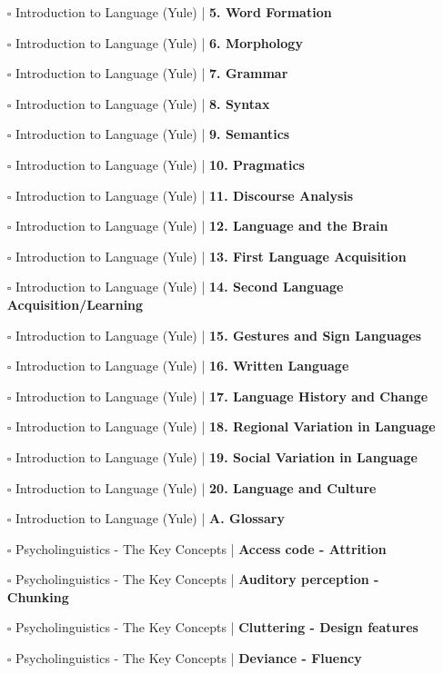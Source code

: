 \documentclass[a4, landscape, 12pt]{article}
\newcommand{\checkbox}{$\square$}%
\begin{document}
\begin{itemize}
{}
\item [\checkbox]  Introduction to Language (Yule) | \textbf{ 5. Word Formation
}
\item [\checkbox]  Introduction to Language (Yule) | \textbf{ 6. Morphology
}
\item [\checkbox]  Introduction to Language (Yule) | \textbf{ 7. Grammar
}
\item [\checkbox]  Introduction to Language (Yule) | \textbf{ 8. Syntax
}
\item [\checkbox]  Introduction to Language (Yule) | \textbf{ 9. Semantics
}
\item [\checkbox]  Introduction to Language (Yule) | \textbf{ 10. Pragmatics
}
\item [\checkbox]  Introduction to Language (Yule) | \textbf{ 11. Discourse Analysis
}
\item [\checkbox]  Introduction to Language (Yule) | \textbf{ 12. Language and the Brain
}
\item [\checkbox]  Introduction to Language (Yule) | \textbf{ 13. First Language Acquisition
}
\item [\checkbox]  Introduction to Language (Yule) | \textbf{ 14. Second Language Acquisition/Learning
}
\item [\checkbox]  Introduction to Language (Yule) | \textbf{ 15. Gestures and Sign Languages
}
\item [\checkbox]  Introduction to Language (Yule) | \textbf{ 16. Written Language
}
\item [\checkbox]  Introduction to Language (Yule) | \textbf{ 17. Language History and Change
}
\item [\checkbox]  Introduction to Language (Yule) | \textbf{ 18. Regional Variation in Language
}
\item [\checkbox]  Introduction to Language (Yule) | \textbf{ 19. Social Variation in Language
}
\item [\checkbox]  Introduction to Language (Yule) | \textbf{ 20. Language and Culture
}
\item [\checkbox]  Introduction to Language (Yule) | \textbf{ A. Glossary
}
\item [\checkbox]  Psycholinguistics - The Key Concepts | \textbf{ Access code - Attrition
}
\item [\checkbox]  Psycholinguistics - The Key Concepts | \textbf{ Auditory perception - Chunking
}
\item [\checkbox]  Psycholinguistics - The Key Concepts | \textbf{ Cluttering - Design features
}
\item [\checkbox]  Psycholinguistics - The Key Concepts | \textbf{ Deviance - Fluency
}
\end{itemize}
\end{document}
